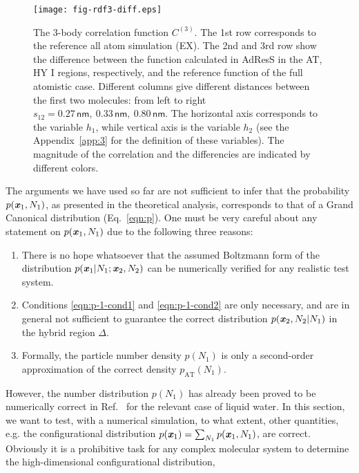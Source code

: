 \documentclass[aip,jcp,a4paper,reprint,onecolumn]{revtex4-1}
\newcommand{\redc}[1]{{\color{red} #1}}
\newcommand{\vect}[1]{\textbf{\textit{#1}}}
\newcommand{\AT}{{\textrm{{AT}}}}
\newcommand{\HY}{{\Delta}}
\newcommand{\corr}{C^{(3)}}
\begin{document}
\begin{figure}
  \centering
  \texttt{[image: fig-rdf3-diff.eps]}
  \caption{\redc{The 3-body correlation function $\corr$.  The 1st row corresponds to the reference all atom simulation (EX).
    The 2nd and 3rd row show the difference between the function calculated in AdResS in the AT, HY I
    regions, respectively, and the reference function of the full atomistic case.}
    Different columns give different distances between
    the first two molecules: from left to right $s_{12} =
    0.27\,\textsf{nm},\ 0.33\,\textsf{nm},\  
    0.80\,\textsf{nm}$.  The horizontal axis corresponds to the variable $h_1$, while vertical
    axis is the variable $h_2$ (see the Appendix~\ref{app:3} for the
    definition of these variables).  The magnitude of the correlation
    and the differencies are indicated by
    different colors.
  }
  \label{fig:tmp2b}
\end{figure}
The arguments we have used so far are not sufficient to infer that the probability $p(\vect x_1 , N_1)$,
as presented in the theoretical analysis, corresponds to that of a Grand Canonical distribution  (Eq.~\eqref{eqn:p}).
One must be very careful about any statement on $p(\vect x_1, N_1)$ 
due to the following three reasons:
\begin{enumerate}
\item There is no hope whatsoever that the assumed Boltzmann form of the distribution $p(\vect x_1|N_1; \vect x_2, N_2)$ can be numerically verified  for any realistic test system. 
\item Conditions \eqref{eqn:p-1-cond1} and \eqref{eqn:p-1-cond2}
are only necessary, and are in general not sufficient to guarantee
the correct distribution $p(\vect x_2, N_2 | N_1)$ in the hybrid region $\HY$.
\item Formally, the particle number density $p(N_1)$ is only a second-order approximation of the correct density $p_{\AT}(N_{1})$.
\end{enumerate}
However, the number distribution $p(N_1)$ has already
been proved to be numerically correct in Ref.~ for the relevant case of liquid water. In this section, we want to test, with a numerical simulation, to what extent, other quantities, e.g. the configurational distribution $p(\vect x_1) = \sum_{N_1}p(\vect x_1, N_1)$, are correct. 
Obviously it is a prohibitive task for any complex molecular system to determine the high-dimensional configurational distribution,
\end{document}
